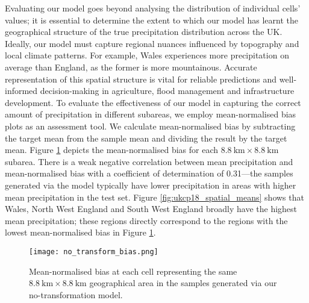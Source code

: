 \documentclass[ oneside,%
                    author={George Herbert},
                    degree={MSci},
                     title={Video Diffusion Models for Climate Simulations},
                  subtitle={}]{dissertation}
\begin{document}
Evaluating our model goes beyond analysing the distribution of individual cells' values; it is essential to determine the extent to which our model has learnt the geographical structure of the true precipitation distribution across the UK. Ideally, our model must capture regional nuances influenced by topography and local climate patterns. For example, Wales experiences more precipitation on average than England, as the former is more mountainous. Accurate representation of this spatial structure is vital for reliable predictions and well-informed decision-making in agriculture, flood management and infrastructure development. To evaluate the effectiveness of our model in capturing the correct amount of precipitation in different subareas, we employ mean-normalised bias plots as an assessment tool. We calculate mean-normalised bias by subtracting the target mean from the sample mean and dividing the result by the target mean. Figure \ref{fig:no_transform_bias} depicts the mean-normalised bias for each $8.8\ \mathrm{km}\times8.8\ \mathrm{km}$ subarea. There is a weak negative correlation between mean precipitation and mean-normalised bias with a coefficient of determination of 0.31---the samples generated via the model typically have lower precipitation in areas with higher mean precipitation in the test set. Figure \ref{fig:ukcp18_spatial_means} shows that Wales, North West England and South West England broadly have the highest mean precipitation; these regions directly correspond to the regions with the lowest mean-normalised bias in Figure \ref{fig:no_transform_bias}.

\begin{figure}[htbp]
      \centering
      \texttt{[image: no\_transform\_bias.png]}
      \caption{Mean-normalised bias at each cell representing the same $8.8\ \mathrm{km}\times 8.8\ \mathrm{km}$ geographical area in the samples generated via our no-transformation model.}
      \label{fig:no_transform_bias}
\end{figure}
\end{document}
